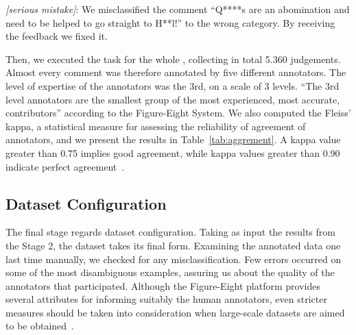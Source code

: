 \documentclass{article}
\begin{document}
\textit{[serious mistake]}: We misclassified the comment ``Q****s are an abomination and need to be helped to go straight to H**l!'' to the wrong category. By receiving the feedback we fixed it.

Then, we executed the task for the whole , collecting in total 5.360 judgements. Almost every comment was therefore annotated by five different annotators. The level of expertise of the annotators was the 3rd, on a scale of 3 levels. ``The 3rd level annotators are the smallest group of the most experienced, most accurate, contributors'' according to the Figure-Eight System. We also computed the Fleiss' kappa, a statistical measure for assessing the reliability of agreement of annotators, and we present the results in Table~\ref{tab:aggrement}. A kappa value greater than 0.75 implies good agreement, while kappa values greater than 0.90 indicate perfect agreement~\cite{minitab}.

\begin{table}[ht]
\centering
{}
\caption{Reliability of annotators agreement per label}
\label{tab:aggrement}
\end{table}

\subsection{Dataset Configuration}
The final stage regards dataset configuration. Taking as input the results from the Stage 2, the dataset takes its final form. Examining the annotated data one last time manually, we checked for any misclassification. Few errors occurred on some of the most disambiguous examples, assuring us about the quality of the annotators that participated. Although the Figure-Eight platform provides several attributes for informing suitably the human annotators, even stricter measures should be taken into consideration when large-scale datasets are aimed to be obtained~\cite{DBLP:conf/lrec/HaagsmaBN20}. 
\end{document}
